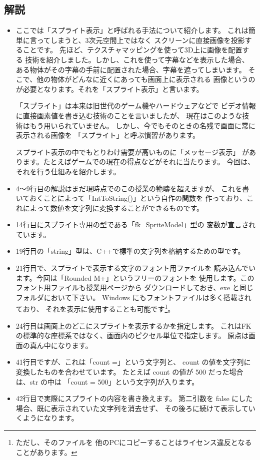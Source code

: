 \subsection*{解説}
\begin{itemize}
 \item ここでは「スプライト表示」と呼ばれる手法について紹介します。
	これは簡単に言ってしまうと、3次元空間上ではなく
	スクリーンに直接画像を投影することです。
	先ほど、テクスチャマッピングを使って3D上に画像を配置する
	技術を紹介しました。しかし、これを使って字幕などを表示した場合、
	ある物体がその字幕の手前に配置された場合、字幕を遮ってしまいます。
	そこで、他の物体がどんなに近くにあっても画面上に表示される
	画像というのが必要となります。それを「スプライト表示」と言います。

	「スプライト」は本来は旧世代のゲーム機やハードウェアなどで
	ビデオ情報に直接画素値を書き込む技術のことを言いましたが、
	現在はこのような技術はもう用いられていません。
	しかし、今でもそのときの名残で画面に常に表示される画像を
	「スプライト」と呼ぶ慣習があります。

	スプライト表示の中でもとりわけ需要が高いものに「メッセージ表示」
	があります。たとえばゲームでの現在の得点などがそれに当たります。
	今回は、それを行う仕組みを紹介します。

 \item 4〜9行目の解説はまだ現時点でのこの授業の範疇を超えますが、
	これを書いておくことによって「IntToString()」という自作の関数を
	作っており、これによって数値を文字列に変換することができるものです。

 \item 14行目にスプライト専用の型である「fk\_SpriteModel」型の
	変数が宣言されています。

 \item 19行目の「string」型は、C++で標準の文字列を格納するための型です。

 \item 21行目で、スプライトで表示する文字のフォント用ファイルを
	読み込んでいます。今回は「Rounded M+」というフリーのフォントを
	使用します。このフォント用ファイルも授業用ページから
	ダウンロードしておき、exe と同じフォルダにおいて下さい。
	Windows にもフォントファイルは多く搭載されており、
	それを表示に使用することも可能です\footnote{ただし、そのファイルを
	他のPCにコピーすることはライセンス違反となることがあります。}。
	
 \item 24行目は画面上のどこにスプライトを表示するかを指定します。
	これはFKの標準的な座標系ではなく、画面内のピクセル単位で指定します。
	原点は画面の真ん中になります。

 \item 41行目ですが、これは「count =」という文字列と、
	count の値を文字列に変換したものを合わせています。
	たとえば count の値が 500 だった場合は、str の中は
	「count = 500」という文字列が入ります。

 \item 42行目で実際にスプライトの内容を書き換えます。
	第二引数を false にした場合、既に表示されていた文字列を消去せず、
	その後ろに続けて表示していくようになります。

\end{itemize}
\newpage
